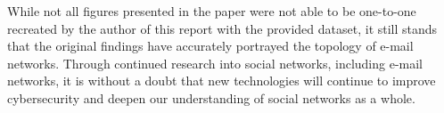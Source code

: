 \documentclass[11pt]{article}
\begin{document}
\begin{multicols}{2}
While not all figures presented in the paper were not able to be one-to-one recreated by the author of this report with the provided dataset, it still stands that the original findings have accurately portrayed the topology of e-mail networks. Through continued research into social networks, including e-mail networks, it is without a doubt that new technologies will continue to improve cybersecurity and deepen our understanding of social networks as a whole.

\end{multicols}

\newpage
\printbibliography %
\end{document}

